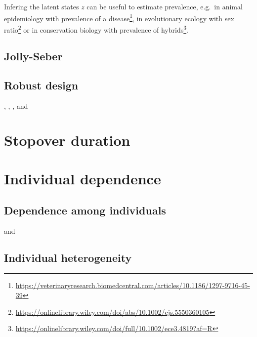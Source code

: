 \documentclass[
  12pt,
]{krantz}
\renewcommand{\href}[2]{#2\footnote{\url{#1}}}
\begin{document}
\citet{santostasi_use_2019}

Infering the latent states \(z\) can be useful to estimate prevalence, e.g.~in animal epidemiology with \href{https://veterinaryresearch.biomedcentral.com/articles/10.1186/1297-9716-45-39}{prevalence of a disease}, in evolutionary ecology with \href{https://onlinelibrary.wiley.com/doi/abs/10.1002/cjs.5550360105}{sex ratio} or in conservation biology with \href{https://onlinelibrary.wiley.com/doi/full/10.1002/ece3.4819?af=R}{prevalence of hybrids}.

\hypertarget{jolly-seber}{%
\section{Jolly-Seber}\label{jolly-seber}}

\hypertarget{robust-design}{%
\section{Robust design}\label{robust-design}}

\citet{karamanlidis_evidence_2015}, \citet{santostasi_robust_2016}, \citet{gibson_application_2018}, and \citet{rankin_full-capture_2016}

\hypertarget{stopover}{%
\chapter{Stopover duration}\label{stopover}}

\citet{guerin_advances_2017}

\hypertarget{individual-dependence}{%
\chapter{Individual dependence}\label{individual-dependence}}

\hypertarget{dependence-among-individuals}{%
\section{Dependence among individuals}\label{dependence-among-individuals}}

\citet{culina_multievent_2013} and \citet{cubaynes_modeling_2021}

\hypertarget{individual-heterogeneity}{%
\section{Individual heterogeneity}\label{individual-heterogeneity}}
\end{document}
